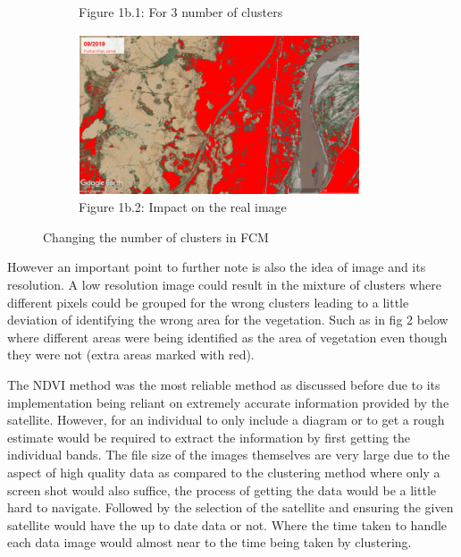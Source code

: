 \documentclass[12pt,a4paper,IEEEtran]{article}
\begin{document}
\begin{figure}[ht]
\begin{subfigure}{0.45\textwidth}
        \caption{Figure 1b.1: For 3 number of clusters}
        \label{fig:subfig3}
    \end{subfigure}
	\hfill
	\begin{subfigure}{0.45\textwidth}
        \includegraphics[width=\linewidth]{fig1b_ans.PNG} %
        \caption{Figure 1b.2: Impact on the real image}
        \label{fig:subfig4}
    \end{subfigure}
    \caption{Changing the number of clusters in FCM}
    \label{fig:overall}
\end{figure}

However an important point to further note is also the idea of image and its resolution. A low resolution image could result in the mixture of clusters where different pixels could be grouped for the wrong clusters leading to a little deviation of identifying the wrong area for the vegetation. Such as in fig 2 below where different areas were being identified as the area of vegetation even though they were not (extra areas marked with red). 



The NDVI method was the most reliable method as discussed before due to its implementation being reliant on extremely accurate information provided by the satellite. However, for an individual to only include a diagram or to get a rough estimate would be required to extract the information by first getting the individual bands. The file size of the images themselves are very large due to the aspect of high quality data as compared to the clustering method where only a screen shot would also suffice, the process of getting the data would be a little hard to navigate. Followed by the selection of the satellite and ensuring the given satellite would have the up to date data or not. Where the time taken to handle each data image would almost near to the time being taken by clustering. 
\end{document}
